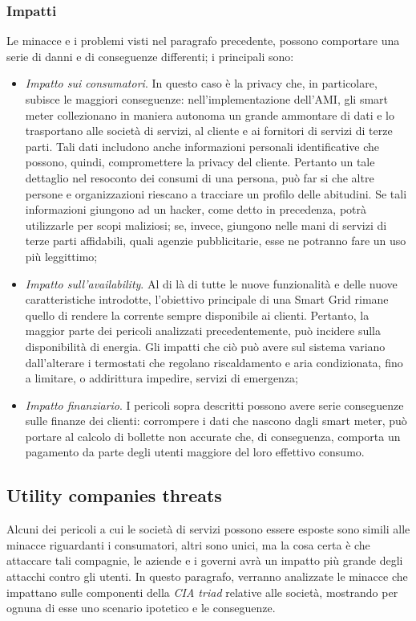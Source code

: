 \subsubsection{Impatti}
Le minacce e i problemi visti nel paragrafo precedente, possono comportare una serie di danni e di conseguenze differenti; i principali sono:
\begin{itemize}
\item \textit{Impatto sui consumatori}. In questo caso è la privacy che, in particolare, subisce le maggiori conseguenze: nell'implementazione dell'AMI, gli smart meter collezionano in maniera autonoma un grande ammontare di dati e lo trasportano alle società di servizi, al cliente e ai fornitori di servizi di terze parti. Tali dati includono anche informazioni personali identificative che possono, quindi, compromettere la privacy del cliente. Pertanto un tale dettaglio nel resoconto dei consumi di una persona, può far si che altre persone e organizzazioni riescano a tracciare un profilo delle abitudini. Se tali informazioni giungono ad un hacker, come detto in precedenza, potrà utilizzarle per scopi maliziosi; se, invece, giungono nelle mani di servizi di terze parti affidabili, quali agenzie pubblicitarie, esse ne potranno fare un uso più leggittimo;
\item \textit{Impatto sull'availability}. Al di là di tutte le nuove funzionalità e delle nuove caratteristiche introdotte, l'obiettivo principale di una Smart Grid rimane quello di rendere la corrente sempre disponibile ai clienti. Pertanto, la maggior parte dei pericoli analizzati precedentemente, può incidere sulla disponibilità di energia. Gli impatti che ciò può avere sul sistema variano dall'alterare i termostati che regolano riscaldamento e aria  condizionata, fino a limitare, o addirittura impedire, servizi di emergenza;
\item \textit{Impatto finanziario}. I pericoli sopra descritti possono avere serie conseguenze sulle finanze dei clienti: corrompere i dati che nascono dagli smart meter, può portare al calcolo di bollette non accurate che, di conseguenza, comporta un pagamento da parte degli utenti maggiore del loro effettivo consumo.
\end{itemize}

\subsection{Utility companies threats}
Alcuni dei pericoli a cui le società di servizi possono essere esposte sono simili alle minacce riguardanti i consumatori, altri sono unici, ma la cosa certa è che attaccare tali compagnie, le aziende e i governi avrà un impatto più grande degli attacchi contro gli utenti. \newline In questo paragrafo, verranno analizzate le minacce che impattano sulle componenti della \textit{CIA triad} relative alle società, mostrando per ognuna di esse uno scenario ipotetico e le conseguenze.


